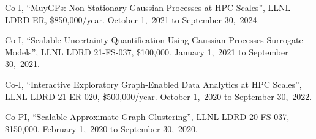 \item Co-I,
	``MuyGPs: Non-Stationary Gaussian Processes at HPC Scales'',
	LLNL LDRD ER,
	\$850,000/year.
	October 1,~2021 to September 30,~2024.

\item Co-I,
	``Scalable Uncertainty Quantification Using Gaussian Processes Surrogate Models'',
	LLNL LDRD 21-FS-037,
	\$100,000.
	January 1,~2021 to September 30,~2021.

\item Co-I,
        ``Interactive Exploratory Graph-Enabled Data Analytics at HPC Scales'',
        LLNL LDRD 21-ER-020,
        \$500,000/year.
        October 1,~2020 to September 30,~2022.

\item Co-PI,
	``Scalable Approximate Graph Clustering'',
	LLNL LDRD 20-FS-037,
	\$150,000.
	February 1,~2020 to September 30,~2020.
